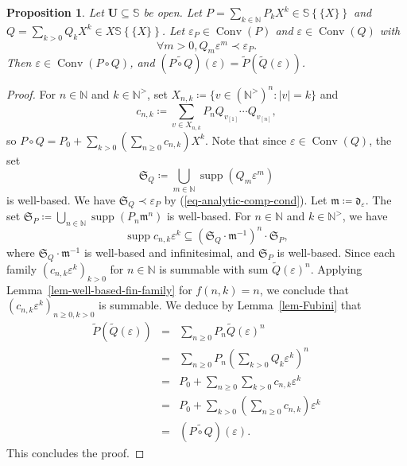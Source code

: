 \documentclass{article}
\newcommand{\assign}{\coloneqq}
\newcommand{\suchthat}{:}
\newcommand{\tmop}[1]{\ensuremath{\operatorname{#1}}}
\newtheorem{proposition}[theorem]{Proposition}
\theoremstyle{remark}\newtheorem*{convention*}{Convention}
\begin{document}
\begin{proposition}
  \label{prop-Taylor-composition-pow}Let $\mathbf{U} \subseteq \mathbb{S}$ be
  open. Let $P = \sum_{k \in \mathbb{N}} P_k X^k \in \mathbb{S} \left\{ \!\!
  \{ X \} \!\! \right\}$ and $Q = \sum_{k > 0} Q_k X^k \in X\mathbb{S} \left\{
  \!\! \{ X \} \!\! \right\}$. Let $\varepsilon_P \in \tmop{Conv} (P)$ and
  $\varepsilon \in \tmop{Conv} (Q)$ with
  \begin{equation}
    \forall m > 0, Q_m \varepsilon^m \prec \varepsilon_P .
    \label{eq-analytic-comp-cond}
  \end{equation}
  Then $\varepsilon \in \tmop{Conv} (P \circ Q)$, and $(\widetilde{P \circ Q})
  (\varepsilon) = \tilde{P} (\tilde{Q} (\varepsilon))$.
\end{proposition}

\begin{proof}
  For $n \in \mathbb{N}$ and $k \in \mathbb{N}^{>}$, set $X_{n, k} \assign \{
  v \in (\mathbb{N}^{>})^n \suchthat | v | = k \}$ and
  \[ c_{n, k} \assign \sum_{v \in X_{n, k}} P_n Q_{v_{[1]}} \cdots
     Q_{v_{[n]}}, \]
  so $P \circ Q = P_0 + \sum_{k > 0} \left( \sum_{n \geqslant 0} c_{n, k}
  \right) X^k$. Note that since $\varepsilon \in \tmop{Conv} (Q)$, the set
  \[ \mathfrak{S}_Q \assign \bigcup_{m \in \mathbb{N}} \tmop{supp} (Q_m
     \varepsilon^m) \]
  is well-based. We have $\mathfrak{S}_Q \prec \varepsilon_P$ by
  (\ref{eq-analytic-comp-cond}). Let $\mathfrak{m} \assign
  \mathfrak{d}_{\varepsilon}$. The set $\mathfrak{S}_P \assign \bigcup_{n \in
  \mathbb{N}} \tmop{supp} (P_n \mathfrak{m}^n)$ is well-based. For $n \in
  \mathbb{N}$ and $k \in \mathbb{N}^{>}$, we have
  \[ \tmop{supp} c_{n, k} \varepsilon^k \subseteq (\mathfrak{S}_Q \cdot
     \mathfrak{m}^{- 1})^n \cdot \mathfrak{S}_P, \]
  where $\mathfrak{S}_Q \cdot \mathfrak{m}^{- 1}$ is well-based and
  infinitesimal, and $\mathfrak{S}_P$ is well-based. Since each family $(c_{n,
  k} \varepsilon^k)_{k > 0}$ for $n \in \mathbb{N}$ is summable with sum
  $\tilde{Q} (\varepsilon)^n$. Applying Lemma~\ref{lem-well-based-fin-family} for
  $f (n, k) = n$, we conclude that $(c_{n, k} \varepsilon^k)_{n \geqslant 0, k
  > 0}$ is summable. We deduce by Lemma~\ref{lem-Fubini} that
  \begin{eqnarray*}
    \tilde{P} (\tilde{Q} (\varepsilon)) & = & \sum_{n \geqslant 0} P_n 
    \tilde{Q} (\varepsilon)^n\\
    & = & \sum_{n \geqslant 0} P_n  \left( \sum_{k > 0} Q_k \varepsilon^k
    \right)^n\\
    & = & P_0 + \sum_{n \geqslant 0} \sum_{k > 0} c_{n, k} \varepsilon^k\\
    & = & P_0 + \sum_{k > 0} \left( \sum_{n \geqslant 0} c_{n, k} \right)
    \varepsilon^k\\
    & = & (\widetilde{P \circ Q}) (\varepsilon) .
  \end{eqnarray*}
  This concludes the proof.
\end{proof}
\end{document}
